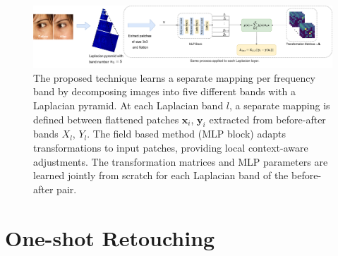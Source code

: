 \begin{landscape}\centering
\vspace*{\fill}
\begin{figure}[htpb]
  \centering
  \includegraphics[width=1.5\textwidth]{Chapters/detail-retouching-figs/MainFig.pdf}
  \caption{The proposed technique learns a separate mapping per frequency band by decomposing images into five different bands with a Laplacian pyramid. At each Laplacian band $l$, a separate mapping is defined between flattened patches $\mathbf{x}_i$, $\mathbf{y}_i$ extracted from before-after bands $X_l$, $Y_l$. The field based method (MLP block) adapts transformations to input patches, providing local context-aware adjustments. The transformation matrices and MLP parameters are learned jointly from scratch for each Laplacian band of the before-after pair.}
\end{figure}
\vfill
\end{landscape}




\section{One-shot Retouching}
\label{sec:Methodology}

